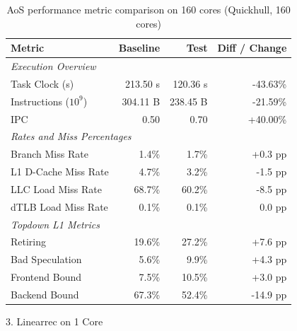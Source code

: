    \begin{table}[htbp]
      \centering
      \caption{AoS performance metric comparison on 160 cores (Quickhull, 160 cores)}
      \label{tab:perf_comparison_aos_quickhull_160cores}
      \begin{tabular}{lrrr}
        \toprule
        \textbf{Metric} & \textbf{Baseline} & \textbf{Test} & \textbf{Diff / Change} \\
        \midrule
        \multicolumn{4}{l}{\textit{Execution Overview}} \\
        \quad Task Clock (s)           & 213.50 s   & 120.36 s   & -43.63\%   \\
        \quad Instructions ($10^9$)    & 304.11 B  & 238.45 B  & -21.59\%   \\
        \quad IPC                      & 0.50       & 0.70       & +40.00\%   \\
        \midrule
        \multicolumn{4}{l}{\textit{Rates and Miss Percentages}} \\
        \quad Branch Miss Rate         & 1.4\%      & 1.7\%      & +0.3 pp    \\
        \quad L1 D-Cache Miss Rate     & 4.7\%      & 3.2\%      & -1.5 pp    \\
        \quad LLC Load Miss Rate       & 68.7\%     & 60.2\%     & -8.5 pp    \\
        \quad dTLB Load Miss Rate      & 0.1\%      & 0.1\%      & 0.0 pp     \\
        \midrule
        \multicolumn{4}{l}{\textit{Topdown L1 Metrics}} \\
        \quad Retiring                 & 19.6\%     & 27.2\%     & +7.6 pp   \\
        \quad Bad Speculation          & 5.6\%     & 9.9\%     & +4.3 pp   \\
        \quad Frontend Bound           & 7.5\%     & 10.5\%     & +3.0 pp   \\
        \quad Backend Bound            & 67.3\%     & 52.4\%     & -14.9 pp   \\
        \bottomrule
      \end{tabular}
    \end{table}

  3. Linearrec on 1 Core

